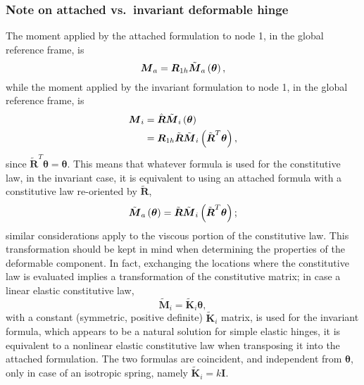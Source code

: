 \documentclass[10pt,dvips,fleqn,subeqn]{report}
\newcommand{\T}[1]{\boldsymbol{#1}}
\begin{document}
\subsubsection{Note on attached vs.\ invariant deformable hinge}
The moment applied by the attached formulation to node 1,
in the global reference frame, is
\begin{equation}
	\T{M}_a = \T{R}_{1h} \tilde{\T{M}}_a\plbr{\T{\theta}} ,
\end{equation}
while the moment applied by the invariant formulation to node 1,
in the global reference frame, is
\begin{align}
	\T{M}_i &= \hat{\T{R}} \tilde{\T{M}}_i\plbr{\T{\theta}} \\
	&= \T{R}_{1h} \tilde{\T{R}} \tilde{\T{M}}_i\plbr{\tilde{\T{R}}^T \T{\theta}} ,
\end{align}
since $\tilde{\T{R}}^T \T{\theta}=\T{\theta}$.
This means that whatever formula is used for the constitutive law,
in the invariant case, it is equivalent to using an attached formula 
with a constitutive law re-oriented by $\tilde{\T{R}}$,
\begin{equation}
	\tilde{\T{M}}_a\plbr{\T{\theta}}
		= \tilde{\T{R}} \tilde{\T{M}}_i\plbr{\tilde{\T{R}}^T \T{\theta}} ;
\end{equation}
similar considerations apply to the viscous portion of the constitutive law.
This transformation should be kept in mind when determining the properties
of the deformable component.
In fact, exchanging the locations where the constitutive law is evaluated
implies a transformation of the constitutive matrix; in case a linear elastic
constitutive law,
\begin{equation}
	\tilde{\T{M}}_i = \tilde{\T{K}}_i \T{\theta} ,
\end{equation}
with a constant (symmetric, positive definite) $\tilde{\T{K}}_i$ matrix,
is used for the invariant formula, which appears to be a natural solution 
for simple elastic hinges, it is equivalent to a nonlinear elastic 
constitutive law when transposing it into the attached formulation.
The two formulas are coincident, and independent from $\T{\theta}$,
only in case of an isotropic spring, namely $\tilde{\T{K}}_i=k\T{I}$.
\end{document}
